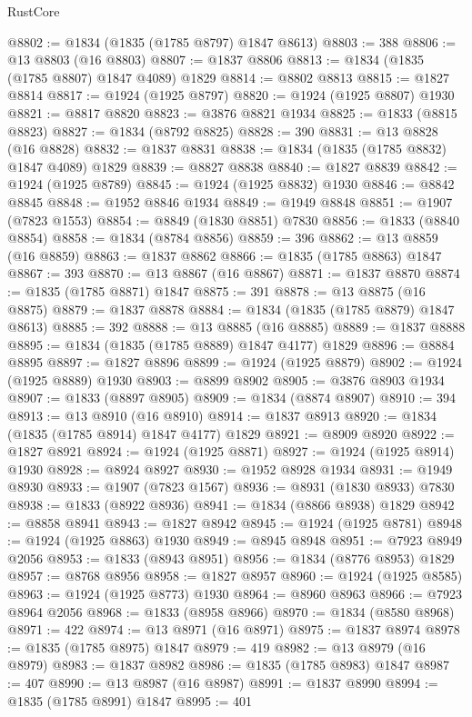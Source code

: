 \begin{lexlean}{RustCore}
\begin{coremodule}
@8802 := @1834 (@1835 (@1785 @8797) @1847 @8613)
@8803 := 388
@8806 := @13 @8803 (@16 @8803)
@8807 := @1837 @8806
@8813 := @1834 (@1835 (@1785 @8807) @1847 @4089) @1829
@8814 := @8802 @8813
@8815 := @1827 @8814
@8817 := @1924 (@1925 @8797)
@8820 := @1924 (@1925 @8807) @1930
@8821 := @8817 @8820
@8823 := @3876 @8821 @1934
@8825 := @1833 (@8815 @8823)
@8827 := @1834 (@8792 @8825)
@8828 := 390
@8831 := @13 @8828 (@16 @8828)
@8832 := @1837 @8831
@8838 := @1834 (@1835 (@1785 @8832) @1847 @4089) @1829
@8839 := @8827 @8838
@8840 := @1827 @8839
@8842 := @1924 (@1925 @8789)
@8845 := @1924 (@1925 @8832) @1930
@8846 := @8842 @8845
@8848 := @1952 @8846 @1934
@8849 := @1949 @8848
@8851 := @1907 (@7823 @1553)
@8854 := @8849 (@1830 @8851) @7830
@8856 := @1833 (@8840 @8854)
@8858 := @1834 (@8784 @8856)
@8859 := 396
@8862 := @13 @8859 (@16 @8859)
@8863 := @1837 @8862
@8866 := @1835 (@1785 @8863) @1847
@8867 := 393
@8870 := @13 @8867 (@16 @8867)
@8871 := @1837 @8870
@8874 := @1835 (@1785 @8871) @1847
@8875 := 391
@8878 := @13 @8875 (@16 @8875)
@8879 := @1837 @8878
@8884 := @1834 (@1835 (@1785 @8879) @1847 @8613)
@8885 := 392
@8888 := @13 @8885 (@16 @8885)
@8889 := @1837 @8888
@8895 := @1834 (@1835 (@1785 @8889) @1847 @4177) @1829
@8896 := @8884 @8895
@8897 := @1827 @8896
@8899 := @1924 (@1925 @8879)
@8902 := @1924 (@1925 @8889) @1930
@8903 := @8899 @8902
@8905 := @3876 @8903 @1934
@8907 := @1833 (@8897 @8905)
@8909 := @1834 (@8874 @8907)
@8910 := 394
@8913 := @13 @8910 (@16 @8910)
@8914 := @1837 @8913
@8920 := @1834 (@1835 (@1785 @8914) @1847 @4177) @1829
@8921 := @8909 @8920
@8922 := @1827 @8921
@8924 := @1924 (@1925 @8871)
@8927 := @1924 (@1925 @8914) @1930
@8928 := @8924 @8927
@8930 := @1952 @8928 @1934
@8931 := @1949 @8930
@8933 := @1907 (@7823 @1567)
@8936 := @8931 (@1830 @8933) @7830
@8938 := @1833 (@8922 @8936)
@8941 := @1834 (@8866 @8938) @1829
@8942 := @8858 @8941
@8943 := @1827 @8942
@8945 := @1924 (@1925 @8781)
@8948 := @1924 (@1925 @8863) @1930
@8949 := @8945 @8948
@8951 := @7923 @8949 @2056
@8953 := @1833 (@8943 @8951)
@8956 := @1834 (@8776 @8953) @1829
@8957 := @8768 @8956
@8958 := @1827 @8957
@8960 := @1924 (@1925 @8585)
@8963 := @1924 (@1925 @8773) @1930
@8964 := @8960 @8963
@8966 := @7923 @8964 @2056
@8968 := @1833 (@8958 @8966)
@8970 := @1834 (@8580 @8968)
@8971 := 422
@8974 := @13 @8971 (@16 @8971)
@8975 := @1837 @8974
@8978 := @1835 (@1785 @8975) @1847
@8979 := 419
@8982 := @13 @8979 (@16 @8979)
@8983 := @1837 @8982
@8986 := @1835 (@1785 @8983) @1847
@8987 := 407
@8990 := @13 @8987 (@16 @8987)
@8991 := @1837 @8990
@8994 := @1835 (@1785 @8991) @1847
@8995 := 401

\end{coremodule}
\end{lexlean}
